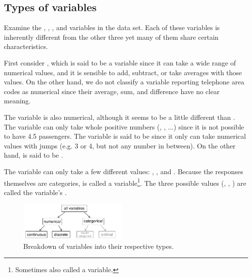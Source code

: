 \subsection{Types of variables}
\label{variableTypes}

Examine the , , , and  variables in the  data set. Each of these variables is inherently different from the other three yet many of them share certain characteristics.


First consider , which is said to be a  variable since it can take a wide range of numerical values, and it is sensible to add, subtract, or take averages with those values. On the other hand, we do not classify a variable reporting telephone area codes as numerical since their average, sum, and difference have no clear meaning.

The  variable is also numerical, although it seems to be a little different than . The variable  can only take whole positive numbers (, , ...) since it is not possible to have 4.5 passengers. The variable  is said to be  since it only can take numerical values with jumps (e.g. 3 or 4, but not any number in between). On the other hand,  is said to be .

The variable  can only take a few different values: , , and . Because the responses themselves are categories,  is called a  variable\footnote{Sometimes also called a  variable.}. The three possible values (, , ) are called the variable's .

\begin{figure}
\centering
\includegraphics[width=0.48\textwidth]{01/figures/variables/variables}
\caption{Breakdown of variables into their respective types.}
\label{variables}
\end{figure}

